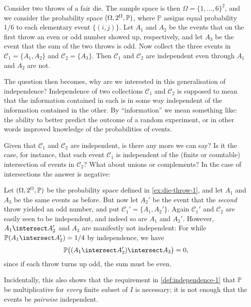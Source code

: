 \documentclass[article, a4paper, 11pt, oneside]{memoir}
\numberwithin{equation}{chapter}
\newcommand{\calC}{\mathcal{C}}
\renewcommand{\P}{\mathbb{P}}
\begin{document}
\begin{example}
    \label{ex:die-throw-1}
    Consider two throws of a fair die. The sample space is then $\Omega = \{1, \ldots, 6\}^2$, and we consider the probability space $(\Omega, \powerset{\Omega}, \P)$, where $\P$ assigns equal probability $1/6$ to each elementary event $\{(i,j)\}$. Let $A_1$ and $A_2$ be the events that on the first throw an even or odd number showed up, respectively, and let $A_3$ be the event that the sum of the two throws is odd. Now collect the three events in $\calC_1 = \{A_1, A_2\}$ and $\calC_2 = \{A_3\}$. Then $\calC_1$ and $\calC_2$ are independent even through $A_1$ and $A_2$ are not.
\end{example}
%
The question then becomes, why are we interested in this generalisation of independence? Independence of two collections $\calC_1$ and $\calC_2$ is supposed to mean that the information contained in each is in some way independent of the information contained in the other. By \enquote{information} we mean something like: the ability to better predict the outcome of a random experiment, or in other words improved knowledge of the probabilities of events.

Given that $\calC_1$ and $\calC_2$ are independent, is there any more we can say? Is it the case, for instance, that each event $\calC_1$ is independent of the (finite or countable) intersection of events in $\calC_2$? What about unions or complements? In the case of intersections the answer is negative:

\begin{example}
    \label{ex:die-throw-2}
    Let $(\Omega,\powerset{\Omega},\P)$ be the probability space defined in \cref{ex:die-throw-1}, and let $A_1$ and $A_3$ be the same events as before. But now let $A_2'$ be the event that the \emph{second} throw yielded an odd number, and put $\calC_1' = \{A_1, A_2'\}$. Again $\calC_1'$ and $\calC_2$ are easily seen to be independent, and indeed so are $A_1$ and $A_2'$. However, $A_1 \intersect A_2'$ and $A_3$ are manifestly not independent: For while $\P(A_1 \intersect A_2') = 1/4$ by independence, we have
    \begin{equation*}
        \P \bigl( (A_1 \intersect A_2') \intersect A_3 \bigr)
            = 0,
    \end{equation*}
    since if each throw turns up odd, the sum must be even.

    Incidentally, this also shows that the requirement in \cref{def:independence-1} that $\P$ be multiplicative for \emph{every} finite subset of $I$ is necessary; it is not enough that the events be \emph{pairwise} independent.
\end{example}
\end{document}
